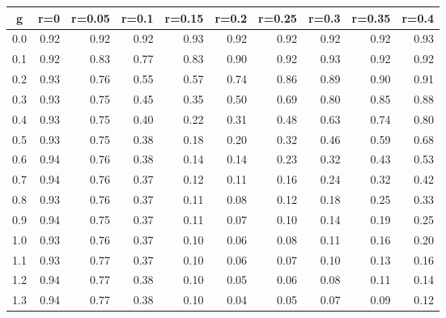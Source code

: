 %
\begin{table}[!tbp]
 \begin{center}
 \begin{tabular}{rrrrrrrrrr}\hline\hline
\multicolumn{1}{c}{g}&\multicolumn{1}{c}{r=0}&\multicolumn{1}{c}{r=0.05}&\multicolumn{1}{c}{r=0.1}&\multicolumn{1}{c}{r=0.15}&\multicolumn{1}{c}{r=0.2}&\multicolumn{1}{c}{r=0.25}&\multicolumn{1}{c}{r=0.3}&\multicolumn{1}{c}{r=0.35}&\multicolumn{1}{c}{r=0.4}\tabularnewline
\hline
0.0&0.92&0.92&0.92&0.93&0.92&0.92&0.92&0.92&0.93\tabularnewline
0.1&0.92&0.83&0.77&0.83&0.90&0.92&0.93&0.92&0.92\tabularnewline
0.2&0.93&0.76&0.55&0.57&0.74&0.86&0.89&0.90&0.91\tabularnewline
0.3&0.93&0.75&0.45&0.35&0.50&0.69&0.80&0.85&0.88\tabularnewline
0.4&0.93&0.75&0.40&0.22&0.31&0.48&0.63&0.74&0.80\tabularnewline
0.5&0.93&0.75&0.38&0.18&0.20&0.32&0.46&0.59&0.68\tabularnewline
0.6&0.94&0.76&0.38&0.14&0.14&0.23&0.32&0.43&0.53\tabularnewline
0.7&0.94&0.76&0.37&0.12&0.11&0.16&0.24&0.32&0.42\tabularnewline
0.8&0.93&0.76&0.37&0.11&0.08&0.12&0.18&0.25&0.33\tabularnewline
0.9&0.94&0.75&0.37&0.11&0.07&0.10&0.14&0.19&0.25\tabularnewline
1.0&0.93&0.76&0.37&0.10&0.06&0.08&0.11&0.16&0.20\tabularnewline
1.1&0.93&0.77&0.37&0.10&0.06&0.07&0.10&0.13&0.16\tabularnewline
1.2&0.94&0.77&0.38&0.10&0.05&0.06&0.08&0.11&0.14\tabularnewline
1.3&0.94&0.77&0.38&0.10&0.04&0.05&0.07&0.09&0.12\tabularnewline
\hline
\end{tabular}

\end{center}

\end{table}

